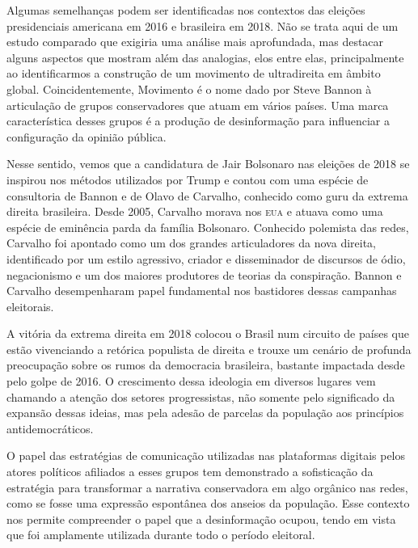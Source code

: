 Algumas semelhanças podem ser identificadas nos contextos das eleições
presidenciais americana em 2016 e brasileira em 2018. Não se trata aqui
de um estudo comparado que exigiria uma análise mais aprofundada, mas
destacar alguns aspectos que mostram além das analogias, elos entre
elas, principalmente ao identificarmos a construção de um movimento de
ultradireita em âmbito global. Coincidentemente, Movimento é o nome dado
por Steve Bannon à articulação de grupos conservadores que atuam em
vários países. Uma marca característica desses grupos é a produção de
desinformação para influenciar a configuração da opinião pública.

Nesse sentido, vemos que a candidatura de Jair Bolsonaro nas eleições de
2018 se inspirou nos métodos utilizados por Trump e contou com uma
espécie de consultoria de Bannon e de Olavo de Carvalho, conhecido como
guru da extrema direita brasileira. Desde 2005, Carvalho morava nos \textsc{eua}
e atuava como uma espécie de eminência parda da família Bolsonaro.
Conhecido polemista das redes, Carvalho foi apontado como um dos grandes
articuladores da nova direita, identificado por um estilo agressivo,
criador e disseminador de discursos de ódio, negacionismo e um dos
maiores produtores de teorias da conspiração. Bannon e Carvalho
desempenharam papel fundamental nos bastidores dessas campanhas
eleitorais.

A vitória da extrema direita em 2018 colocou o Brasil num circuito de
países que estão vivenciando a retórica populista de direita e trouxe um
cenário de profunda preocupação sobre os rumos da democracia brasileira,
bastante impactada desde pelo golpe de 2016. O crescimento dessa
ideologia em diversos lugares vem chamando a atenção dos setores
progressistas, não somente pelo significado da expansão dessas ideias,
mas pela adesão de parcelas da população aos princípios
antidemocráticos.

O papel das estratégias de comunicação utilizadas nas plataformas
digitais pelos atores políticos afiliados a esses grupos tem demonstrado
a sofisticação da estratégia para transformar a narrativa conservadora
em algo orgânico nas redes, como se fosse uma expressão espontânea dos
anseios da população. Esse contexto nos permite compreender o papel que
a desinformação ocupou, tendo em vista que foi amplamente utilizada
durante todo o período eleitoral.

